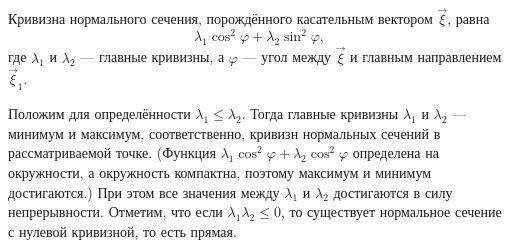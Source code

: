\begin{theorem}
	Кривизна нормального сечения, порождённого касательным вектором $\vec{\xi}$, равна
	\[
		\lambda_1\cos^2\varphi + \lambda_2\sin^2\varphi,
	\]
	где $\lambda_1$ и $\lambda_2$ --- главные кривизны, а $\varphi$ --- угол между $\vec{\xi}$ и главным направлением $\vec{\xi}_1$.
\end{theorem}

Положим для определённости $\lambda_1 \leqslant \lambda_2$. Тогда главные кривизны $\lambda_1$ и $\lambda_2$ --- минимум и максимум, соответственно, кривизн нормальных сечений в рассматриваемой точке. (Функция $\lambda_1\cos^2\varphi + \lambda_2\cos^2\varphi$ определена на окружности, а окружность компактна, поэтому максимум и минимум достигаются.) При этом все значения между $\lambda_1$ и $\lambda_2$ достигаются в силу непрерывности. Отметим, что если $\lambda_1\lambda_2 \leqslant 0$, то существует нормальное сечение с нулевой кривизной, то есть прямая.

